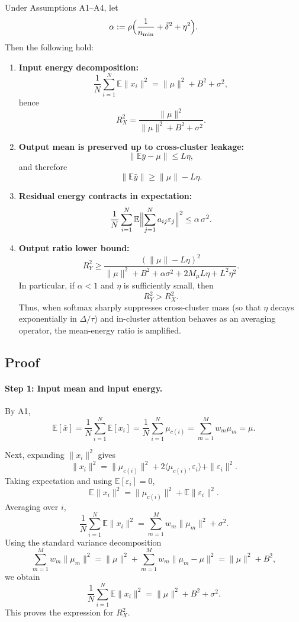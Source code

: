 \begin{theorem}
\label{thm:exp_mean_bias_amplification_revised}
Under Assumptions A1--A4, let
\[
\alpha := \rho\Bigl(\frac{1}{n_{\min}} + \bar{\delta}^2 + \eta^2\Bigr).
\]
Then the following hold:

\begin{enumerate}
\item \textbf{Input energy decomposition:}
\[
\frac{1}{N}\sum_{i=1}^N \mathbb{E}\|x_i\|^2
=
\|\mu\|^2 + B^2 + \sigma^2,
\]
hence
\[
R_X^2
=
\frac{\|\mu\|^2}{\|\mu\|^2 + B^2 + \sigma^2}.
\]

\item \textbf{Output mean is preserved up to cross-cluster leakage:}
\[
\|\mathbb{E}\bar{y} - \mu\| \le L\eta,
\]
and therefore
\[
\|\mathbb{E}\bar{y}\| \ge \|\mu\| - L\eta.
\]

\item \textbf{Residual energy contracts in expectation:}
\[
\frac{1}{N}\sum_{i=1}^N
\mathbb{E}\Bigl\|
\sum_{j=1}^N a_{ij}\varepsilon_j
\Bigr\|^2
\le
\alpha\,\sigma^2.
\]

\item \textbf{Output ratio lower bound:}
\[
R_Y^2
\ge
\frac{(\|\mu\|-L\eta)^2}{
\|\mu\|^2 + B^2 + \alpha\sigma^2 + 2M_\mu L\eta + L^2\eta^2 }.
\]
In particular, if $\alpha < 1$ and $\eta$ is sufficiently small, then
\[
R_Y^2 > R_X^2.
\]
Thus, when softmax sharply suppresses cross-cluster mass (so that $\eta$ decays exponentially in $\Delta/\tau$) and in-cluster attention behaves as an averaging operator, the mean-energy ratio is amplified.
\end{enumerate}
\end{theorem}

\subsection{Proof}

\paragraph{Step 1: Input mean and input energy.}

By A1,
\[
\mathbb{E}[\bar{x}]
=
\frac{1}{N}\sum_{i=1}^N \mathbb{E}[x_i]
=
\frac{1}{N}\sum_{i=1}^N \mu_{c(i)}
=
\sum_{m=1}^M w_m \mu_m
=
\mu.
\]

Next, expanding $\|x_i\|^2$ gives
\[
\|x_i\|^2
=
\|\mu_{c(i)}\|^2
+ 2\langle \mu_{c(i)}, \varepsilon_i\rangle
+ \|\varepsilon_i\|^2.
\]
Taking expectation and using $\mathbb{E}[\varepsilon_i]=0$,
\[
\mathbb{E}\|x_i\|^2
=
\|\mu_{c(i)}\|^2 + \mathbb{E}\|\varepsilon_i\|^2.
\]
Averaging over $i$,
\[
\frac{1}{N}\sum_{i=1}^N \mathbb{E}\|x_i\|^2
=
\sum_{m=1}^M w_m \|\mu_m\|^2 + \sigma^2.
\]
Using the standard variance decomposition
\[
\sum_{m=1}^M w_m \|\mu_m\|^2
=
\|\mu\|^2 + \sum_{m=1}^M w_m \|\mu_m-\mu\|^2
=
\|\mu\|^2 + B^2,
\]
we obtain
\[
\frac{1}{N}\sum_{i=1}^N \mathbb{E}\|x_i\|^2
=
\|\mu\|^2 + B^2 + \sigma^2.
\]
This proves the expression for $R_X^2$.

